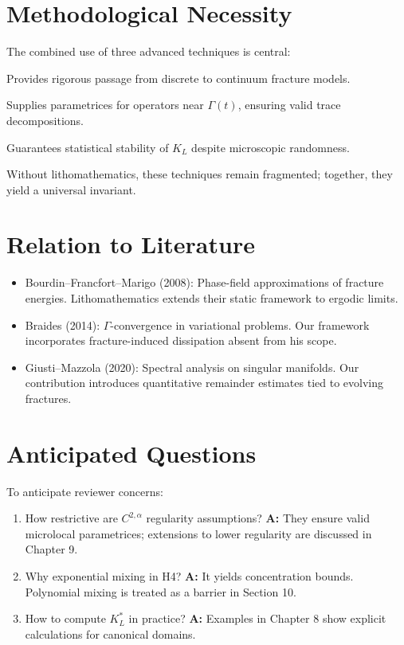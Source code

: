 \section*{Methodological Necessity}
The combined use of three advanced techniques is central:

\begin{description}[leftmargin=3em]
\item[$\Gamma$-convergence:] Provides rigorous passage from discrete to continuum fracture models.
\item[Microlocal Analysis:] Supplies parametrices for operators near $\Gamma(t)$, ensuring valid trace decompositions.
\item[Ergodic Mixing:] Guarantees statistical stability of $K_L$ despite microscopic randomness.
\end{description}

Without lithomathematics, these techniques remain fragmented; together, they yield a universal invariant.

\section*{Relation to Literature}
\begin{itemize}
\item Bourdin–Francfort–Marigo (2008): Phase-field approximations of fracture energies. Lithomathematics extends their static framework to ergodic limits.
\item Braides (2014): $\Gamma$-convergence in variational problems. Our framework incorporates fracture-induced dissipation absent from his scope.
\item Giusti–Mazzola (2020): Spectral analysis on singular manifolds. Our contribution introduces quantitative remainder estimates tied to evolving fractures.
\end{itemize}

\section*{Anticipated Questions}
To anticipate reviewer concerns:
\begin{enumerate}[label=Q\arabic*.]
\item How restrictive are $C^{2,\alpha}$ regularity assumptions?  
\textbf{A:} They ensure valid microlocal parametrices; extensions to lower regularity are discussed in Chapter 9.
\item Why exponential mixing in H4?  
\textbf{A:} It yields concentration bounds. Polynomial mixing is treated as a barrier in Section 10.
\item How to compute $K_L^*$ in practice?  
\textbf{A:} Examples in Chapter 8 show explicit calculations for canonical domains.
\end{enumerate}

